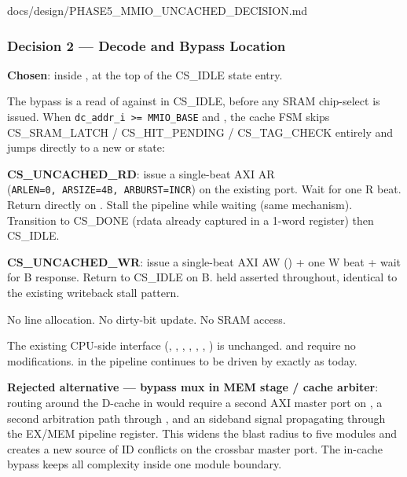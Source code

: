 \begin{relocated}{docs/design/PHASE5_MMIO_UNCACHED_DECISION.md}
\subsubsection{Decision 2 --- Decode and Bypass Location}\label{ds:dec:phase5-mmio-uncached:decision-2-decode-and-bypass-location}

\textbf{Chosen}: inside , at the top of the
CS\_IDLE state entry.

The bypass is a read of  against  in
CS\_IDLE, before any SRAM chip-select is issued. When
\texttt{dc\_\allowbreak{}addr\_\allowbreak{}i\ >=\allowbreak{}\ MMIO\_\allowbreak{}BASE}
and , the cache FSM skips
CS\_\allowbreak{}SRAM\_\allowbreak{}LATCH /
CS\_\allowbreak{}HIT\_\allowbreak{}PENDING /
CS\_\allowbreak{}TAG\_\allowbreak{}CHECK entirely and jumps directly to
a new  or  state:

\textbf{CS\_\allowbreak{}UNCACHED\_\allowbreak{}RD}: issue a single-beat
AXI AR
(\texttt{ARLEN=\allowbreak{}0,\allowbreak{}\ ARSIZE=\allowbreak{}4B,\allowbreak{}\ ARBURST=\allowbreak{}INCR})
on the existing  port. Wait for one R beat. Return
 directly on . Stall the pipeline
while waiting (same  mechanism). Transition to CS\_DONE
(rdata already captured in a 1-word register) then CS\_IDLE.

\textbf{CS\_\allowbreak{}UNCACHED\_\allowbreak{}WR}: issue a single-beat
AXI AW () + one W beat + wait for B response. Return to
CS\_IDLE on B.  held asserted throughout, identical to
the existing writeback stall pattern.

No line allocation. No dirty-bit update. No SRAM access.

The existing  CPU-side interface (,
, , , ,
, ) is unchanged.
 and  require
no modifications.  in the pipeline continues to
be driven by  exactly as today.

\textbf{Rejected alternative --- bypass mux in MEM stage / cache
arbiter}: routing around the D-cache in 
would require a second AXI master port on , a second
arbitration path through , and an
 sideband signal propagating through the EX/MEM
pipeline register. This widens the blast radius to five modules and
creates a new source of ID conflicts on the crossbar master port. The
in-cache bypass keeps all complexity inside one module boundary.


\end{relocated}
